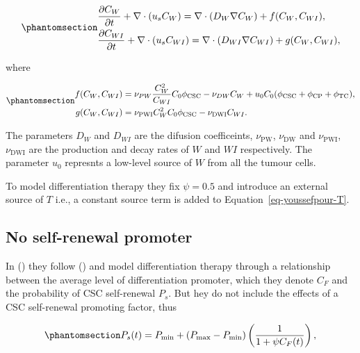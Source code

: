 \documentclass[
  letterpaper,
]{scrreprt}
\theoremstyle{definition}
\theoremstyle{remark}
\begin{document}
\begin{equation}\phantomsection\label{eq-youssefpour-W-WI}{
\begin{aligned}
&\frac{\partial C_W}{\partial t} + \nabla \cdot (u_s C_W) = \nabla \cdot (D_W \nabla C_W) + f(C_W, C_{WI}), \\
&\frac{\partial C_{WI}}{\partial t} + \nabla \cdot (u_s C_{WI}) = \nabla \cdot (D_{WI} \nabla C_{WI}) + g(C_W, C_{WI}),
\end{aligned}
}\end{equation}

where

\begin{equation}\phantomsection\label{eq-youssefpour-f-g}{
\begin{aligned}
f(C_W, C_{WI}) &= \nu_{PW} \frac{C^2_W}{C_{WI}}C_0 \phi_\text{CSC} - \nu_{DW} C_W + u_0C_0 (\phi_\text{CSC} + \phi_\text{CP} + \phi_\text{TC}), \\
g(C_W, C_{WI}) &= \nu_\text{PWI}C^2_W C_0 \phi_\text{CSC} - \nu_\text{DWI} C_{WI}.
\end{aligned}
}\end{equation}

The parameters \(D_W\) and \(D_{WI}\) are the difusion coefficeints,
\(\nu_\text{PW}\), \(\nu_\text{DW}\) and \(\nu_\text{PWI}\),
\(\nu_\text{DWI}\) are the production and decay rates of \(W\) and
\(WI\) respectively. The parameter \(u_0\) represnts a low-level source
of \(W\) from all the tumour cells.

To model differentiation therapy they fix \(\psi = 0.5\) and introduce
an external source of \(T\) i.e., a constant source term is added to
Equation~\ref{eq-youssefpour-T}.

\subsection{No self-renewal promoter}\label{no-self-renewal-promoter}

In () they follow
() and model
differentiation therapy through a relationship between the average level
of differentiation promoter, which they denote \(C_F\) and the
probability of CSC self-renewal \(P_s\). But hey do not include the
effects of a CSC self-renewal promoting factor, thus

\begin{equation}\phantomsection\label{eq-bachman-Ps}{
P_s(t) = P_\text{min} + (P_\text{max} - P_\text{min}) \left( \frac{1}{1 + \psi C_F(t)} \right),
}\end{equation}
\end{document}
